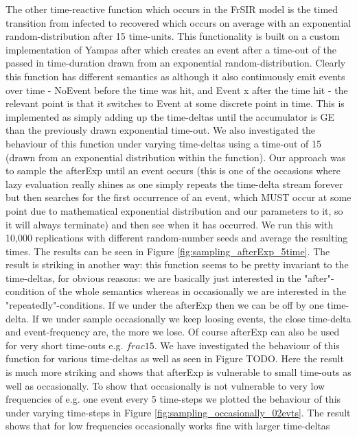 The other time-reactive function which occurs in the FrSIR model is the timed transition from infected to recovered which occurs on average with an exponential random-distribution after 15 time-units. This functionality is built on a custom implementation of Yampas after which creates an event after a time-out of the passed in time-duration drawn from an exponential random-distribution. Clearly this function has different semantics as although it also continuously emit events over time - NoEvent before the time was hit, and Event x after the time hit - the relevant point is that it switches to Event at some discrete point in time. This is implemented as simply adding up the time-deltas until the accumulator is GE than the previously drawn exponential time-out. We also investigated the behaviour of this function under varying time-deltas using a time-out of 15 (drawn from an exponential distribution within the function). Our approach was to sample the afterExp until an event occurs (this is one of the occasions where lazy evaluation really shines as one simply repeats the time-delta stream forever but then searches for the first occurrence of an event, which MUST occur at some point due to mathematical exponential distribution and our parameters to it, so it will always terminate) and then see when it has occurred. We run this with 10,000 replications with different random-number seeds and average the resulting times. The results can be seen in Figure \ref{fig:sampling_afterExp_5time}. The result is striking in another way: this function seems to be pretty invariant to the time-deltas, for obvious reasons: we are basically just interested in the "after"-condition of the whole semantics whereas in occasionally we are interested in the "repeatedly"-conditions. If we under the afterExp then we can be off by one time-delta. If we under sample occasionally we keep loosing events, the close time-delta and event-frequency are, the more we lose. Of course afterExp can also be used for very short time-outs e.g. $frac{1}{5}$. We have investigated the behaviour of this function for various time-deltas as well as seen in Figure TODO. Here the result is much more striking and shows that afterExp is vulnerable to small time-outs as well as occasionally. 
To show that occasionally is not vulnerable to very low frequencies of e.g. one event every 5 time-steps we plotted the behaviour of this under varying time-steps in Figure \ref{fig:sampling_occasionally_02evts}. The result shows that for low frequencies occasionally works fine with larger time-deltas

